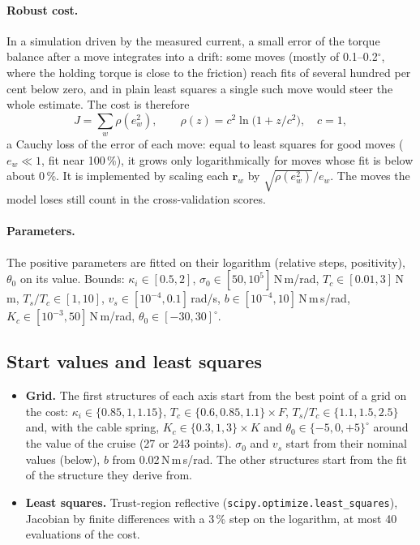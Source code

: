 \documentclass[10pt,a4paper]{article}
\numberwithin{equation}{section}
\begin{document}
\paragraph{Robust cost.} In a simulation driven by the measured current, a small error of the torque balance after a move integrates into a drift: some moves (mostly of 0.1--0.2$^\circ$, where the holding torque is close to the friction) reach fits of several hundred per cent below zero, and in plain least squares a single such move would steer the whole estimate. The cost is therefore
\begin{equation}
J=\sum_w \rho(e_w^2),\qquad \rho(z)=c^2\ln\!\bigl(1+z/c^2\bigr),\quad c=1 ,
\end{equation}
a Cauchy loss of the error of each move: equal to least squares for good moves ($e_w\ll1$, fit near 100\,\%), it grows only logarithmically for moves whose fit is below about 0\,\%. It is implemented by scaling each $\mathbf r_w$ by $\sqrt{\rho(e_w^2)}/e_w$. The moves the model loses still count in the cross-validation scores.

\paragraph{Parameters.} The positive parameters are fitted on their logarithm (relative steps, positivity), $\theta_0$ on its value. Bounds: $\kappa_i\in[0.5,2]$, $\sigma_0\in[50,10^5]$\,N\,m/rad, $T_c\in[0.01,3]$\,N\,m, $T_s/T_c\in[1,10]$, $v_s\in[10^{-4},0.1]$\,rad/s, $b\in[10^{-4},10]$\,N\,m\,s/rad, $K_c\in[10^{-3},50]$\,N\,m/rad, $\theta_0\in[-30,30]^\circ$.

\subsection{Start values and least squares}
\begin{itemize}
\item \textbf{Grid.} The first structures of each axis start from the best point of a grid on the cost: $\kappa_i\in\{0.85,1,1.15\}$, $T_c\in\{0.6,0.85,1.1\}\times F$, $T_s/T_c\in\{1.1,1.5,2.5\}$ and, with the cable spring, $K_c\in\{0.3,1,3\}\times K$ and $\theta_0\in\{-5,0,+5\}^\circ$ around the value of the cruise (27 or 243 points). $\sigma_0$ and $v_s$ start from their nominal values (below), $b$ from 0.02\,N\,m\,s/rad. The other structures start from the fit of the structure they derive from.
\item \textbf{Least squares.} Trust-region reflective (\texttt{scipy.optimize.least\_squares}), Jacobian by finite differences with a 3\,\% step on the logarithm, at most 40 evaluations of the cost.
\end{itemize}
\end{document}
